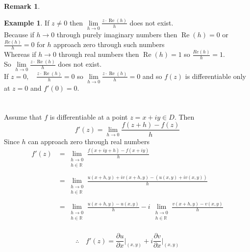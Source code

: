 \documentclass[11pt,a4paper]{article}
\theoremstyle{definition}
\newtheorem{example}[thm]{Example}
\newtheorem{remark}[thm]{Remark}
\begin{document}
\begin{remark}
\begin{example}
If $z\neq 0$ then $\lim\limits_{h\rightarrow 0} \frac{z \cdot \operatorname{Re}(h)}{h}$ does not exist.\\
Because if $h\longrightarrow 0$ through purely imaginary numbers then $\operatorname{Re}(h) = 0$ or $\frac{Re(h)}{h} = 0$ for $h$ approach zero through such numbers\\
Whereas if $h\longrightarrow 0$ through real numbers then $\operatorname{Re}(h) = 1$ so $\frac{Re(h)}{h} = 1$.\\
So $\lim\limits_{h\rightarrow 0} \frac{z \cdot \operatorname{Re}(h)}{h}$ does not exist.\\

If $z = 0, \quad  \frac{z\cdot \operatorname{Re}(h)}{h} = 0$ so $\lim\limits_{h\rightarrow 0} \frac{z \cdot \operatorname{Re}(h)}{h}=0$ and so $f(z)$ is differentiable only at $z= 0$ and $f'(0) = 0$.\\\\\\







Assume that $f$ is differentiable at a point $z = x + iy \in D$. Then $$f'(z) = \lim\limits_{h\rightarrow 0 } \frac{f(z + h) - f(z)}{h}$$
Since $h$ can approach zero through real numbers
\begin{align*}
f'(z) & =  \lim_{\substack{h \rightarrow 0\\h\in \mathbb{R}}} \frac{f(x + iy + h) - f(x + iy)}{h}\\\\
& = \lim_{\substack{h \rightarrow 0\\h\in \mathbb{R}}}\frac{u(x + h,y) + iv(x + h, y) - (u(x,y) + iv(x,y))}{h}\\\\
& = \lim_{\substack{h \rightarrow 0\\h\in \mathbb{R}}} \frac{u(x+ h, y) - u(x,y)}{h} - i\,\lim_{\substack{h \rightarrow 0\\h\in \mathbb{R}}}\frac{v(x + h, y) - v(x,y)}{h}\\
\end{align*}


$$\therefore\quad f'(z) = \frac{\partial u}{\partial x}\Bigg|_{(x,y)} + i \frac{\partial v}{\partial x}\Bigg|_{(x,y)}$$


\end{example}
\end{remark}
\end{document}

